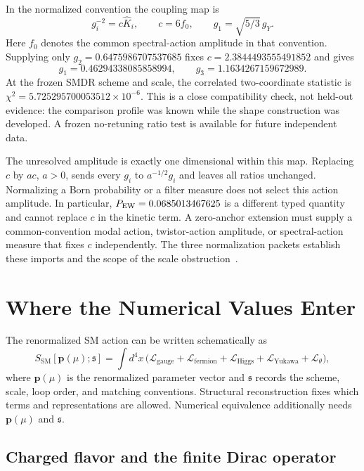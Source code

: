 \documentclass[11pt]{article}
\newcommand{\cL}{\mathcal{L}}
\newcommand{\SM}{\mathrm{SM}}
\begin{document}
In the normalized convention the coupling map is
\begin{equation}
g_i^{-2}=c\widehat K_i,\qquad c=6f_0,
\qquad g_1=\sqrt{5/3}\,g_Y.
\end{equation}
Here $f_0$ denotes the common spectral-action amplitude in that convention.  Supplying only
$g_2=0.6475986707537685$ fixes $c=2.3844493555491852$ and gives
\begin{equation}
g_1=0.46294338085858994,\qquad g_3=1.1634267159672989.
\end{equation}
At the frozen SMDR scheme and scale, the correlated two-coordinate statistic is
$\chi^2=5.725295700053512\times10^{-6}$.  This is a close compatibility check, not
held-out evidence: the comparison profile was known while the shape construction was
developed.  A frozen no-retuning ratio test is available for future independent data.

The unresolved amplitude is exactly one dimensional within this map.  Replacing
$c$ by $a c$, $a>0$, sends every $g_i$ to $a^{-1/2}g_i$ and leaves all ratios unchanged.
Normalizing a Born probability or a filter measure does not select this action amplitude.
In particular, $P_{\rm EW}=0.0685013467625$ is a different typed quantity and cannot replace
$c$ in the kinetic term.  A zero-anchor extension must supply a common-convention modal
action, twistor-action amplitude, or spectral-action measure that fixes $c$ independently.
The three normalization packets establish these imports and the scope of the scale
obstruction~\cite{SMGaugeNormalization}.

\section{Where the Numerical Values Enter}

The renormalized SM action can be written schematically as
\begin{equation}
S_{\SM}[\mathbf p(\mu);\mathfrak s]
=\int \!d^4x\,\bigl(\cL_{\mathrm{gauge}}+\cL_{\mathrm{fermion}}
+\cL_{\mathrm{Higgs}}+\cL_{\mathrm{Yukawa}}+\cL_{\theta}\bigr),
\end{equation}
where $\mathbf p(\mu)$ is the renormalized parameter vector and $\mathfrak s$ records the
scheme, scale, loop order, and matching conventions.  Structural reconstruction fixes which
terms and representations are allowed.  Numerical equivalence additionally needs
$\mathbf p(\mu)$ and $\mathfrak s$.

\subsection{Charged flavor and the finite Dirac operator}
\end{document}
